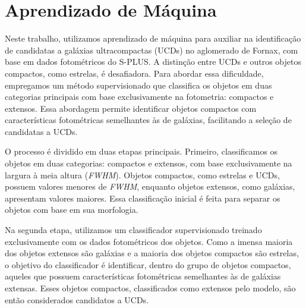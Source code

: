
\section{Aprendizado de Máquina}\label{sec:aprendizado_maquina}
Neste trabalho, utilizamos aprendizado de máquina para auxiliar na identificação de candidatas a galáxias ultracompactas (UCDs) no aglomerado de Fornax, com base em dados fotométricos do S-PLUS. A distinção entre UCDs e outros objetos compactos, como estrelas, é desafiadora. Para abordar essa dificuldade, empregamos um método supervisionado que classifica os objetos em duas categorias principais com base exclusivamente na fotometria: compactos e extensos. Essa abordagem permite identificar objetos compactos com características fotométricas semelhantes às de galáxias, facilitando a seleção de candidatas a UCDs.

O processo é dividido em duas etapas principais. Primeiro, classificamos os objetos em duas categorias: compactos e extensos, com base exclusivamente na largura à meia altura (\textit{FWHM}). Objetos compactos, como estrelas e UCDs, possuem valores menores de \textit{FWHM}, enquanto objetos extensos, como galáxias, apresentam valores maiores. Essa classificação inicial é feita para separar os objetos com base em sua morfologia.

Na segunda etapa, utilizamos um classificador supervisionado treinado exclusivamente com os dados fotométricos dos objetos. Como a imensa maioria dos objetos extensos são galáxias e a maioria dos objetos compactos são estrelas, o objetivo do classificador é identificar, dentro do grupo de objetos compactos, aqueles que possuem características fotométricas semelhantes às de galáxias extensas. Esses objetos compactos, classificados como extensos pelo modelo, são então considerados candidatos a UCDs.

